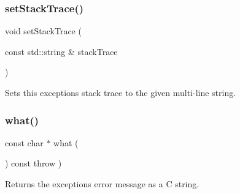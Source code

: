 \subsubsection{\texorpdfstring{set\+Stack\+Trace()}{setStackTrace()}}
{\footnotesize\ttfamily void set\+Stack\+Trace (\begin{DoxyParamCaption}\item[{const std\+::string \&}]{stack\+Trace }\end{DoxyParamCaption})\hspace{0.3cm}{\ttfamily [protected]}}



Sets this exception\textquotesingle{}s stack trace to the given multi-\/line string. 

\mbox{\label{classErrorException_a8d4b96162e93e11e5816d83702578af8}} 
\subsubsection{\texorpdfstring{what()}{what()}}
{\footnotesize\ttfamily const char $\ast$ what (\begin{DoxyParamCaption}{ }\end{DoxyParamCaption}) const throw  ) \hspace{0.3cm}{\ttfamily [virtual]}}



Returns the exception\textquotesingle{}s error message as a C string. 

